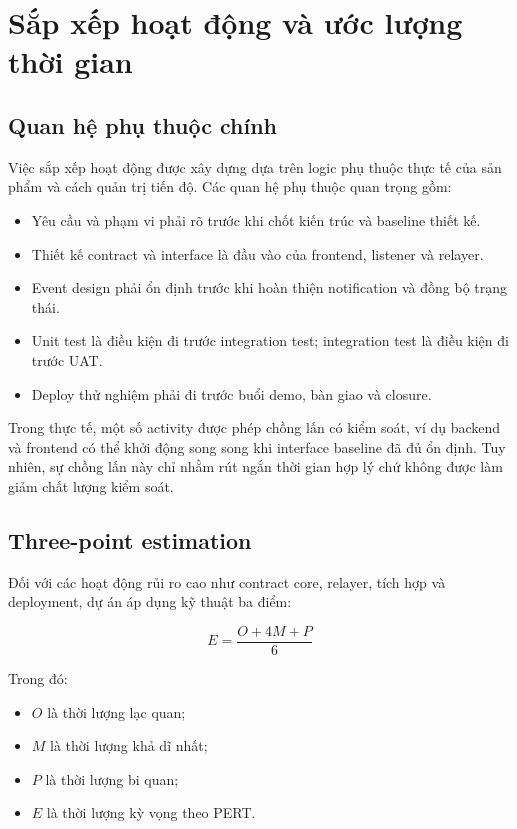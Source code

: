 \section{Sắp xếp hoạt động và ước lượng thời gian}

\subsection{Quan hệ phụ thuộc chính}

Việc sắp xếp hoạt động được xây dựng dựa trên logic phụ thuộc thực tế của sản phẩm và cách quản trị tiến độ. Các quan hệ phụ thuộc quan trọng gồm:

\begin{itemize}
  \item Yêu cầu và phạm vi phải rõ trước khi chốt kiến trúc và baseline thiết kế.
  \item Thiết kế contract và interface là đầu vào của frontend, listener và relayer.
  \item Event design phải ổn định trước khi hoàn thiện notification và đồng bộ trạng thái.
  \item Unit test là điều kiện đi trước integration test; integration test là điều kiện đi trước UAT.
  \item Deploy thử nghiệm phải đi trước buổi demo, bàn giao và closure.
\end{itemize}

Trong thực tế, một số activity được phép chồng lấn có kiểm soát, ví dụ backend và frontend có thể khởi động song song khi interface baseline đã đủ ổn định. Tuy nhiên, sự chồng lấn này chỉ nhằm rút ngắn thời gian hợp lý chứ không được làm giảm chất lượng kiểm soát.

\subsection{Three-point estimation}

Đối với các hoạt động rủi ro cao như contract core, relayer, tích hợp và deployment, dự án áp dụng kỹ thuật ba điểm:

\[
E = \frac{O + 4M + P}{6}
\]

Trong đó:

\begin{itemize}
  \item $O$ là thời lượng lạc quan;
  \item $M$ là thời lượng khả dĩ nhất;
  \item $P$ là thời lượng bi quan;
  \item $E$ là thời lượng kỳ vọng theo PERT.
\end{itemize}

